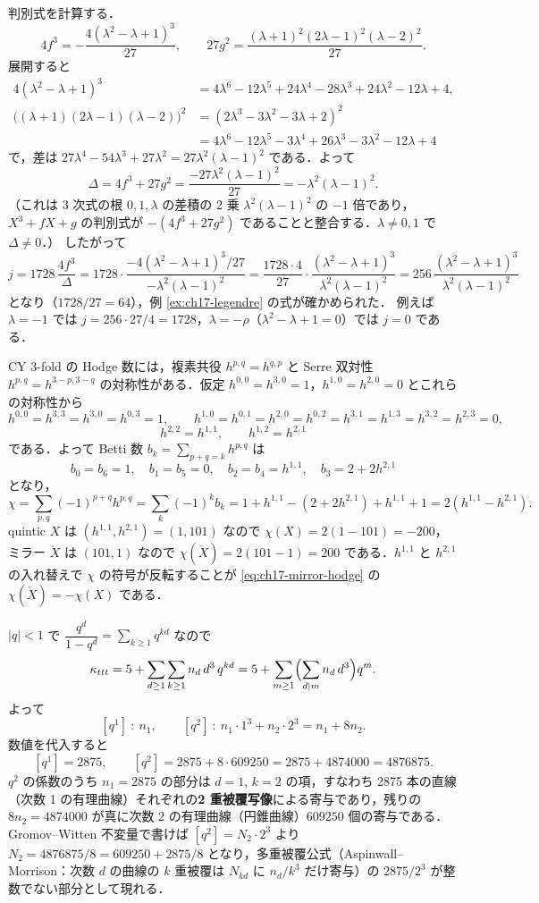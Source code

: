 判別式を計算する．
\[
4f^3=-\frac{4(\lambda^2-\lambda+1)^3}{27},\qquad 27g^2=\frac{(\lambda+1)^2(2\lambda-1)^2(\lambda-2)^2}{27}.
\]
展開すると
\[
\begin{aligned}
4(\lambda^2-\lambda+1)^3&=4\lambda^6-12\lambda^5+24\lambda^4-28\lambda^3+24\lambda^2-12\lambda+4,\\
\bigl((\lambda+1)(2\lambda-1)(\lambda-2)\bigr)^2&=(2\lambda^3-3\lambda^2-3\lambda+2)^2\\
&=4\lambda^6-12\lambda^5-3\lambda^4+26\lambda^3-3\lambda^2-12\lambda+4
\end{aligned}
\]
で，差は $27\lambda^4-54\lambda^3+27\lambda^2=27\lambda^2(\lambda-1)^2$ である．よって
\[
\Delta=4f^3+27g^2=\frac{-27\lambda^2(\lambda-1)^2}{27}=-\lambda^2(\lambda-1)^2 .
\]
（これは 3 次式の根 $0,1,\lambda$ の差積の 2 乗 $\lambda^2(\lambda-1)^2$ の $-1$ 倍であり，$X^3+fX+g$ の判別式が $-(4f^3+27g^2)$ であることと整合する．$\lambda\neq0,1$ で $\Delta\neq0$．）
したがって
\[
j=1728\,\frac{4f^3}{\Delta}=1728\cdot\frac{-4(\lambda^2-\lambda+1)^3/27}{-\lambda^2(\lambda-1)^2}
=\frac{1728\cdot4}{27}\cdot\frac{(\lambda^2-\lambda+1)^3}{\lambda^2(\lambda-1)^2}
=256\,\frac{(\lambda^2-\lambda+1)^3}{\lambda^2(\lambda-1)^2}
\]
となり（$1728/27=64$），例 \ref{ex:ch17-legendre} の式が確かめられた．
例えば $\lambda=-1$ では $j=256\cdot27/4=1728$，$\lambda=-\rho$（$\lambda^2-\lambda+1=0$）では $j=0$ である．

CY 3-fold の Hodge 数には，複素共役 $h^{p,q}=h^{q,p}$ と Serre 双対性 $h^{p,q}=h^{3-p,3-q}$ の対称性がある．仮定 $h^{0,0}=h^{3,0}=1$，$h^{1,0}=h^{2,0}=0$ とこれらの対称性から
\[
h^{0,0}=h^{3,3}=h^{3,0}=h^{0,3}=1,\qquad
h^{1,0}=h^{0,1}=h^{2,0}=h^{0,2}=h^{3,1}=h^{1,3}=h^{3,2}=h^{2,3}=0,
\]
\[
h^{2,2}=h^{1,1},\qquad h^{1,2}=h^{2,1}
\]
である．よって Betti 数 $b_k=\sum_{p+q=k}h^{p,q}$ は
\[
b_0=b_6=1,\quad b_1=b_5=0,\quad b_2=b_4=h^{1,1},\quad b_3=2+2h^{2,1}
\]
となり，
\[
\chi=\sum_{p,q}(-1)^{p+q}h^{p,q}=\sum_k(-1)^kb_k=1+h^{1,1}-(2+2h^{2,1})+h^{1,1}+1=2(h^{1,1}-h^{2,1}) .
\]
quintic $X$ は $(h^{1,1},h^{2,1})=(1,101)$ なので $\chi(X)=2(1-101)=-200$，ミラー $\check X$ は $(101,1)$ なので $\chi(\check X)=2(101-1)=200$ である．$h^{1,1}$ と $h^{2,1}$ の入れ替えで $\chi$ の符号が反転することが \eqref{eq:ch17-mirror-hodge} の $\chi(\check X)=-\chi(X)$ である．

$|q|<1$ で $\dfrac{q^d}{1-q^d}=\sum_{k\ge1}q^{kd}$ なので
\[
\kappa_{ttt}=5+\sum_{d\ge1}\sum_{k\ge1}n_d\,d^3\,q^{kd}=5+\sum_{m\ge1}\Bigl(\sum_{d\mid m}n_d\,d^3\Bigr)q^m .
\]
よって
\[
[q^1]\ :\ n_1,\qquad [q^2]\ :\ n_1\cdot1^3+n_2\cdot2^3=n_1+8n_2 .
\]
数値を代入すると
\[
[q^1]=2875,\qquad [q^2]=2875+8\cdot609250=2875+4874000=4876875 .
\]
$q^2$ の係数のうち $n_1=2875$ の部分は $d=1$, $k=2$ の項，すなわち 2875 本の直線（次数 1 の有理曲線）それぞれの\textbf{2 重被覆写像}による寄与であり，残りの $8n_2=4874000$ が真に次数 2 の有理曲線（円錐曲線）$609250$ 個の寄与である．
Gromov--Witten 不変量で書けば $[q^2]=N_2\cdot2^3$ より $N_2=4876875/8=609250+2875/8$ となり，多重被覆公式（Aspinwall--Morrison：次数 $d$ の曲線の $k$ 重被覆は $N_{kd}$ に $n_d/k^3$ だけ寄与）の $2875/2^3$ が整数でない部分として現れる．


